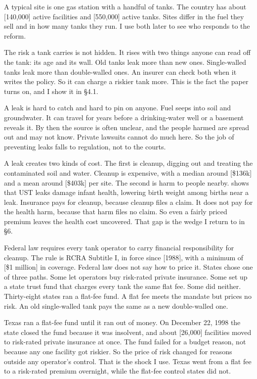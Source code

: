 \documentclass[
  12pt,
]{article}
\begin{document}
A typical site is one gas station with a handful of tanks. The country
has about {[}140,000{]} active facilities and {[}550,000{]} active
tanks. Sites differ in the fuel they sell and in how many tanks they
run. I use both later to see who responds to the reform.

The risk a tank carries is not hidden. It rises with two things anyone
can read off the tank: its age and its wall. Old tanks leak more than
new ones. Single-walled tanks leak more than double-walled ones. An
insurer can check both when it writes the policy. So it can charge a
riskier tank more. This is the fact the paper turns on, and I show it in
§4.1.

A leak is hard to catch and hard to pin on anyone. Fuel seeps into soil
and groundwater. It can travel for years before a drinking-water well or
a basement reveals it. By then the source is often unclear, and the
people harmed are spread out and may not know. Private lawsuits cannot
do much here. So the job of preventing leaks falls to regulation, not to
the courts.

A leak creates two kinds of cost. The first is cleanup, digging out and
treating the contaminated soil and water. Cleanup is expensive, with a
median around {[}\$136k{]} and a mean around {[}\$403k{]} per site. The
second is harm to people nearby. \citet{marcus_going_2021} shows that
UST leaks damage infant health, lowering birth weight among births near
a leak. Insurance pays for cleanup, because cleanup files a claim. It
does not pay for the health harm, because that harm files no claim. So
even a fairly priced premium leaves the health cost uncovered. That gap
is the wedge I return to in §6.

Federal law requires every tank operator to carry financial
responsibility for cleanup. The rule is RCRA Subtitle I, in force since
{[}1988{]}, with a minimum of {[}\$1 million{]} in coverage. Federal law
does not say how to price it. States chose one of three paths. Some let
operators buy risk-rated private insurance. Some set up a state trust
fund that charges every tank the same flat fee. Some did neither.
Thirty-eight states ran a flat-fee fund. A flat fee meets the mandate
but prices no risk. An old single-walled tank pays the same as a new
double-walled one.

Texas ran a flat-fee fund until it ran out of money. On December 22,
1998 the state closed the fund because it was insolvent, and about
{[}26,000{]} facilities moved to risk-rated private insurance at once.
The fund failed for a budget reason, not because any one facility got
riskier. So the price of risk changed for reasons outside any operator's
control. That is the shock I use. Texas went from a flat fee to a
risk-rated premium overnight, while the flat-fee control states did not.
\end{document}
